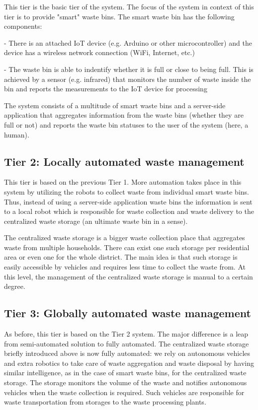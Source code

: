 \documentclass{article}
\begin{document}
This tier is the basic tier of the system. The focus of the system in context of this tier is to
provide "smart" waste bins. The smart waste bin has the following components:

- There is an attached IoT device (e.g. Arduino or other microcontroller) and the device has a
wireless network connection (WiFi, Internet, etc.)

- The waste bin is able to indentify whether it is full or close to being full. This is achieved by
a sensor (e.g. infrared) that monitors the number of waste inside the bin and reports the
measurements to the IoT device for processing

The system consists of a multitude of smart waste bins and a server-side application that aggregates
information from the waste bins (whether they are full or not) and reports the waste bin statuses to
the user of the system (here, a human).

\subsection{Tier 2: Locally automated waste management}

This tier is based on the previous Tier 1. More automation takes place in this system by utilizing
the robots to collect waste from individual smart waste bins. Thus, instead of using a server-side
application waste bins the information is sent to a local robot which is responsible for waste
collection and waste delivery to the centralized waste storage (an ultimate waste bin in a sense).

The centralized waste storage is a bigger waste collection place that aggregates waste from multiple
households. There can exist one such storage per residential area or even one for the whole
district. The main idea is that such storage is easily accessible by vehicles and requires less time
to collect the waste from. At this level, the management of the centralized waste storage is manual
to a certain degree.

\subsection{Tier 3: Globally automated waste management}

As before, this tier is based on the Tier 2 system. The major difference is a leap from
semi-automated solution to fully automated. The centralized waste storage briefly introduced above
is now fully automated: we rely on autonomous vehicles and extra robotics to take care of waste
aggregation and waste disposal by having similar intelligence, as in the case of smart waste bins,
for the centralized waste storage. The storage monitors the volume of the waste and notifies
autonomous vehicles when the waste collection is required. Such vehicles are responsible for waste
transportation from storages to the waste processing plants.
\end{document}

